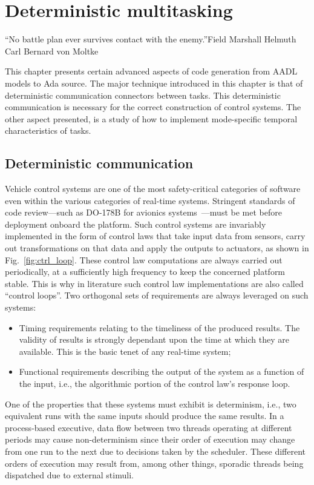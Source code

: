 \chapter{Deterministic multitasking}{``No battle plan ever survives contact with the
  enemy.''}{Field Marshall Helmuth Carl Bernard von Moltke}
\label{chap:adv_code}

This chapter presents certain advanced aspects of code generation from
AADL models to Ada source. The major technique introduced in this
chapter is that of deterministic communication connectors between
tasks. This deterministic communication is necessary for the correct
construction of control systems. The other aspect presented, is a
study of how to implement mode-specific temporal characteristics of
tasks.

\section{Deterministic communication}
Vehicle control systems are one of the most safety-critical categories
of software even within the various categories of real-time
systems. Stringent standards of code review---such as DO-178B for
avionics systems~\cite{do178b}---must be met before deployment onboard
the platform. Such control systems are invariably implemented in the
form of control laws that take input data from sensors, carry out
transformations on that data and apply the outputs to actuators, as
shown in Fig.~\ref{fig:ctrl_loop}. These control law computations are
always carried out periodically, at a sufficiently high frequency to
keep the concerned platform stable. This is why in literature such
control law implementations are also called ``control loops''. Two
orthogonal sets of requirements are always leveraged on such systems:

\begin{itemize}
\item{Timing requirements relating to the timeliness of the produced
  results. The validity of results is strongly dependant upon the time
  at which they are available. This is the basic tenet of any
  real-time system;}
\item{Functional requirements describing the output of the system as a
  function of the input, i.e., the algorithmic portion of the control
  law's response loop.}
\end{itemize}

One of the properties that these systems must exhibit is determinism,
i.e., two equivalent runs with the same inputs should produce the same
results. In a process-based executive, data flow between two threads
operating at different periods may cause non-determinism since their
order of execution may change from one run to the next due to
decisions taken by the scheduler. These different orders of execution
may result from, among other things, sporadic threads being dispatched
due to external stimuli.

